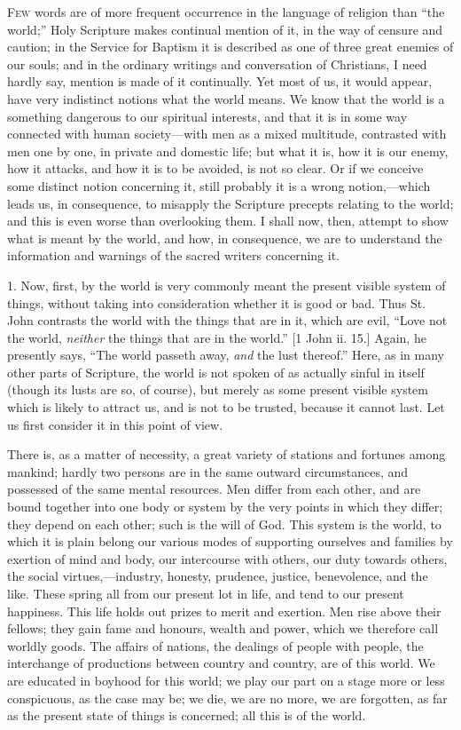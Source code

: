 F\textsc{ew} words are of more frequent occurrence in the language of
religion than ``the world;'' Holy Scripture makes continual
mention of it, in the way of censure and caution; in the Service for
Baptism it is described as one of three great enemies of our souls;
and in the ordinary writings and conversation of Christians, I need
hardly say, mention is made of it continually. Yet most of us, it
would appear, have very indistinct notions what the world means. We
know that the world is a something dangerous to our spiritual
interests, and that it is in some way connected with human society—with
men as a mixed multitude, contrasted with men one by one, in private
and domestic life; but what it is, how it is our enemy, how it
attacks, and how it is to be avoided, is not so clear. Or if we
conceive some distinct notion concerning it, still probably it is a
wrong notion,—which leads us, in consequence, to misapply the
Scripture precepts relating to the world; and this is even worse than
overlooking them. I shall now, then, attempt to show what is meant by
the world, and how, in consequence, we are to understand the
information and warnings of the sacred writers concerning it.

1. Now, first, by the world is very commonly meant the present
visible system of things, without taking into consideration whether it
is good or bad. Thus St. John contrasts the world with the things that
are in it, which are evil, ``Love not the world, \emph{neither}
the things that are in the world.'' [1 John ii. 15.] Again, he
presently says, ``The world passeth away, \emph{and} the lust
thereof.'' Here, as in many other parts of Scripture, the world is
not spoken of as actually sinful in itself (though its lusts are so,
of course), but merely as some present visible system which is likely
to attract us, and is not to be trusted, because it cannot last. Let
us first consider it in this point of view.

There is, as a matter of necessity, a great variety of stations and
fortunes among mankind; hardly two persons are in the same outward
circumstances, and possessed of the same mental resources. Men differ
from each other, and are bound together into one body or system by the
very points in which they differ; they depend on each other; such is
the will of God. This system is the world, to which it is plain belong
our various modes of supporting ourselves and families by exertion of
mind and body, our intercourse with others, our duty towards others,
the social virtues,—industry, honesty, prudence, justice,
benevolence, and the like. These spring all from our present lot in
life, and tend to our present happiness. This life holds out prizes to
merit and exertion. Men rise above their fellows; they gain fame and
honours, wealth and power, which we therefore call worldly goods. The
affairs of nations, the dealings of people with people, the
interchange of productions between country and country, are of this
world. We are educated in boyhood for this world; we play our part on
a stage more or less conspicuous, as the case may be; we die, we are
no more, we are forgotten, as far as the present state of things is
concerned; all this is of the world.


